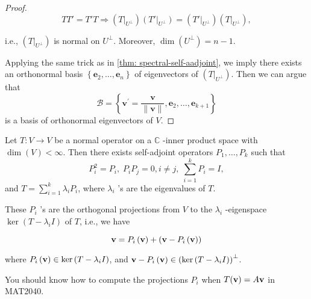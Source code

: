 \begin{proof}
\[
TT' = T'T \Rightarrow  \left( {\left. T\right| }_{{U}^{ \bot  }}\right) \left( {T'{\left. \right| }_{{U}^{ \bot  }}}\right)  = \left( {\left. T'\right| }_{{U}^{ \bot  }}\right) \left( {\left. T\right| }_{{U}^{ \bot  }}\right),
\]

i.e., \(\left( {\left. T\right| }_{{U}^{ \bot  }}\right)\) is normal on \({U}^{ \bot  }\). Moreover, \(\dim \left( {U}^{ \bot  }\right)  = n - 1\).

Applying the same trick as in \autoref{thm: spectral-self-aadjoint}, we imply there exists an orthonormal basis \(\left\{  {{\mathbf{e}}_{2},\ldots,{\mathbf{e}}_{n}}\right\}\) of eigenvectors of \(\left( {\left. T\right| }_{{U}^{ \bot  }}\right)\). Then we can argue that
\[
\mathcal{B} = \left\{  {{\mathbf{v}}^{\prime } = \frac{\mathbf{v}}{\parallel \mathbf{v}\parallel},{\mathbf{e}}_{2},\ldots,{\mathbf{e}}_{k + 1}}\right\}
\]
is a basis of orthonormal eigenvectors of \(V\).
\end{proof}

\begin{corollary}\label{cor:spectral-theorem-normal-operators}
Let \(T : V \rightarrow  V\) be a normal operator on a \(\mathbb{C}\) -inner product space with \(\dim \left( V\right)  < \infty\). Then there exists self-adjoint operators \({P}_{1},\ldots,{P}_{k}\) such that
\[
{P}_{i}^{2} = {P}_{i},\;{P}_{i}{P}_{j} = 0,i \neq  j,\;\mathop{\sum }\limits_{{i = 1}}^{k}{P}_{i} = I,
\]
and \(T = \mathop{\sum }\limits_{{i = 1}}^{k}{\lambda }_{i}{P}_{i}\), where \({\lambda }_{i}\) ’s are the eigenvalues of \(T\).

These \({P}_{i}\) ’s are the orthogonal projections from \(V\) to the \(\lambda_{i}\) -eigenspace \(\ker (T - \lambda_{i}I)\) of \(T\), i.e., we have

\[
{\bf v} = {P}_{i}\left({\bf  v}\right)  + \left( {{\bf v} - {P}_{i}\left({\bf  v}\right) }\right)
\]

where \({P}_{i}\left({\bf  v}\right)  \in  \ker \left( {T - {\lambda }_{i}I}\right)\), and \({\bf v} - {P}_{i}\left({\bf  v}\right)  \in  {\left( \ker \left( T - {\lambda }_{i}I\right) \right) }^{ \bot  }\).
\end{corollary}
You should know how to compute the projections \( P_i \) when \( T({\bf v}) = A{\bf v} \) in MAT2040.

